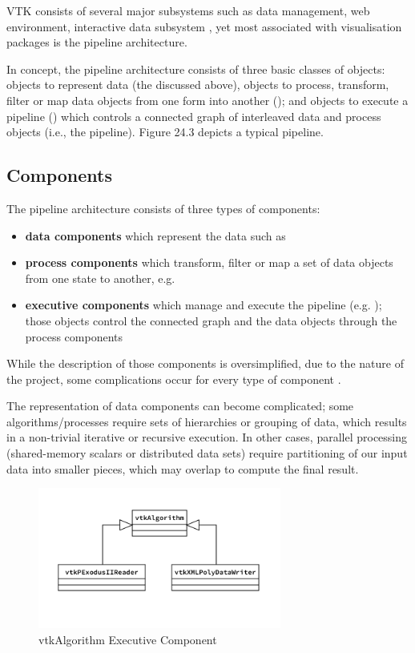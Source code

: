 	
VTK consists of several major subsystems such as data management, web environment, interactive data subsystem \cite{aosabook}, yet most associated with visualisation packages is the pipeline architecture. 

In concept, the pipeline architecture consists of three basic classes of objects: objects to represent data (the  discussed above), objects to process, transform, filter or map data objects from one form into another (); and objects to execute a pipeline () which controls a connected graph of interleaved data and process objects \cite{aosabook} (i.e., the pipeline). Figure 24.3 depicts a typical pipeline.


\subsection{Components}

The pipeline architecture consists of three types of components: 

\begin{itemize}
    \item \textbf{data components} which represent the data such as  
    \item \textbf{process components} which transform, filter or map a set of data objects from one state to another, e.g.  
    \item \textbf{executive components} which manage and execute the pipeline (e.g. ); those objects control the connected graph and the data objects through the process components   
\end{itemize}

While the description of those components is oversimplified, due to the nature of the project, some complications occur for every type of component \cite{git}.

The representation of data components can become complicated; some algorithms/processes require sets of hierarchies or grouping of data, which results in a non-trivial iterative or recursive execution.  In other cases, parallel processing (shared-memory scalars or distributed data sets) require partitioning of our input data into smaller pieces, which may overlap to compute the final result.

\begin{figure}[h]
    \includegraphics[width=8cm]{diagrams/alg.png}
    \caption{vtkAlgorithm Executive Component}
    \label{fig::executive}
\end{figure}

